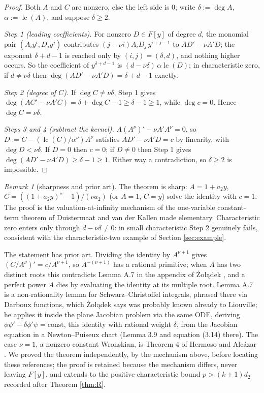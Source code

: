\documentclass[11pt]{article}
\theoremstyle{definition}
\theoremstyle{remark}
\newtheorem{remark}[theorem]{Remark}
\begin{document}
\begin{proof}
Both $A$ and $C$ are nonzero, else the left side is $0$; write $\delta:=\deg A$, $\alpha:=\operatorname{lc}(A)$, and suppose $\delta\geq2$.

\emph{Step 1 (leading coefficients).} For nonzero $D\in F[y]$ of degree $d$, the monomial pair $(A_iy^i,D_jy^j)$ contributes $(j-\nu i)A_iD_j\,y^{i+j-1}$ to $AD'-\nu A'D$; the exponent $\delta+d-1$ is reached only by $(i,j)=(\delta,d)$, and nothing higher occurs. So the coefficient of $y^{\delta+d-1}$ is $(d-\nu\delta)\,\alpha\operatorname{lc}(D)$; in characteristic zero, if $d\neq\nu\delta$ then $\deg(AD'-\nu A'D)=\delta+d-1$ exactly.

\emph{Step 2 (degree of $C$).} If $\deg C\neq\nu\delta$, Step 1 gives $\deg(AC'-\nu A'C)=\delta+\deg C-1\geq\delta-1\geq1$, while $\deg c=0$. Hence $\deg C=\nu\delta$.

\emph{Steps 3 and 4 (subtract the kernel).} $A(A^\nu)'-\nu A'A^\nu=0$, so $D:=C-(\operatorname{lc}(C)/\alpha^\nu)A^\nu$ satisfies $AD'-\nu A'D=c$ by linearity, with $\deg D<\nu\delta$. If $D=0$ then $c=0$; if $D\neq0$ then Step 1 gives $\deg(AD'-\nu A'D)\geq\delta-1\geq1$. Either way a contradiction, so $\delta\geq2$ is impossible.
\end{proof}

\begin{remark}[sharpness and prior art]\label{rem:sharp}
The theorem is sharp: $A=1+a_2y$, $C=((1+a_2y)^\nu-1)/(\nu a_2)$ (or $A=1$, $C=y$) solve the identity with $c=1$. The proof is the valuation-at-infinity mechanism of the one-variable constant-term theorem of Duistermaat and van der Kallen \cite{DvdK} made elementary. Characteristic zero enters only through $d-\nu\delta\neq0$: in small characteristic Step 2 genuinely fails, consistent with the characteristic-two example of Section \ref{sec:example}.

The statement has prior art. Dividing the identity by $A^{\nu+1}$ gives $(C/A^\nu)'=c/A^{\nu+1}$, so $A^{-(\nu+1)}$ has a rational primitive; when $A$ has two distinct roots this contradicts Lemma A.7 in the appendix of \.Zo{\l}\k{a}dek \cite{Zoladek}, and a perfect power $A$ dies by evaluating the identity at its multiple root. Lemma A.7 is a non-rationality lemma for Schwarz--Christoffel integrals, phrased there via Darboux functions, which \.Zo{\l}\k{a}dek says was probably known already to Liouville; he applies it inside the plane Jacobian problem via the same ODE, deriving $\phi\psi'-\delta\phi'\psi=\mathrm{const}$, this identity with rational weight $\delta$, from the Jacobian equation in a Newton--Puiseux chart (Lemma 3.9 and equation (3.14) there). The case $\nu=1$, a nonzero constant Wronskian, is Theorem 4 of Hermoso and Alc\'azar \cite{HA}. We proved the theorem independently, by the mechanism above, before locating these references; the proof is retained because the mechanism differs, never leaving $F[y]$, and extends to the positive-characteristic bound $p>(k+1)d_2$ recorded after Theorem \ref{thm:R}.
\end{remark}
\end{document}
